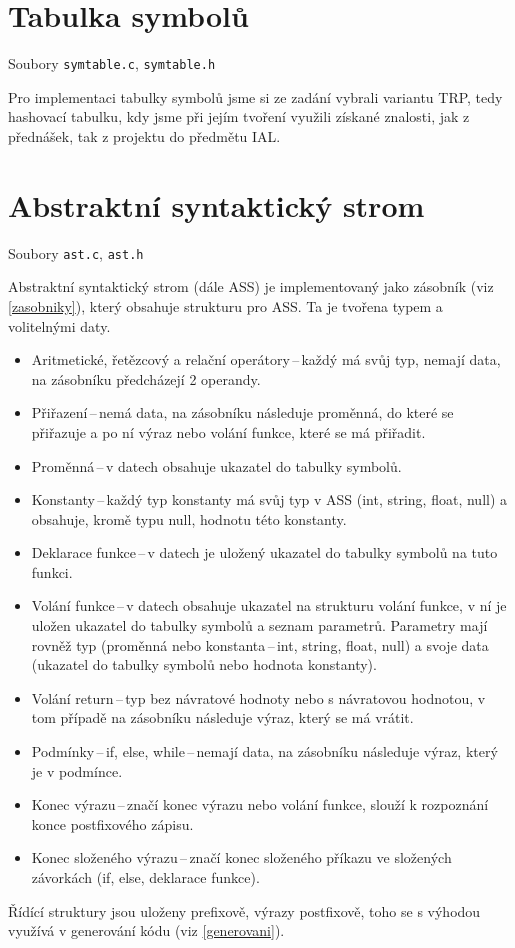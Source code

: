\documentclass[a4paper, 12pt]{article}
\begin{document}
    \section{Tabulka symbolů}
    Soubory \texttt{symtable.c}, \texttt{symtable.h}

    Pro implementaci tabulky symbolů jsme si ze zadání vybrali variantu TRP, tedy hashovací tabulku, kdy jsme při jejím tvoření využili získané znalosti, jak z přednášek, tak z projektu do předmětu IAL.

    \section{Abstraktní syntaktický strom}
    Soubory \texttt{ast.c}, \texttt{ast.h}

    Abstraktní syntaktický strom (dále ASS) je implementovaný jako zásobník (viz \ref{zasobniky}), který obsahuje strukturu pro ASS. Ta je tvořena typem a volitelnými daty.
    \begin{itemize}
        \item Aritmetické, řetězcový a relační operátory\,--\,každý má svůj typ, nemají data, na zásobníku předcházejí 2 operandy.
        \item Přiřazení\,--\,nemá data, na zásobníku následuje proměnná, do které se přiřazuje a po ní výraz nebo volání funkce, které se má přiřadit.
        \item Proměnná\,--\,v datech obsahuje ukazatel do tabulky symbolů.
        \item Konstanty\,--\,každý typ konstanty má svůj typ v ASS (int, string, float, null) a obsahuje, kromě typu null, hodnotu této konstanty.
        \item Deklarace funkce\,--\,v datech je uložený ukazatel do tabulky symbolů na tuto funkci.
        \item Volání funkce\,--\,v datech obsahuje ukazatel na strukturu volání funkce, v ní je uložen ukazatel do tabulky symbolů a seznam parametrů. Parametry mají rovněž typ (proměnná nebo konstanta\,--\,int, string, float, null) a svoje data (ukazatel do tabulky symbolů nebo hodnota konstanty).
        \item Volání return\,--\,typ bez návratové hodnoty nebo s návratovou hodnotou, v tom případě na zásobníku následuje výraz, který se má vrátit.
        \item Podmínky\,--\,if, else, while\,--\,nemají data, na zásobníku následuje výraz, který je v podmínce.
        \item Konec výrazu\,--\,značí konec výrazu nebo volání funkce, slouží k rozpoznání konce postfixového zápisu.
        \item Konec složeného výrazu\,--\,značí konec složeného příkazu ve složených závorkách (if, else, deklarace funkce).
    \end{itemize}
    Řídící struktury jsou uloženy prefixově, výrazy postfixově, toho se s výhodou využívá v generování kódu (viz \ref{generovani}).
\end{document}
